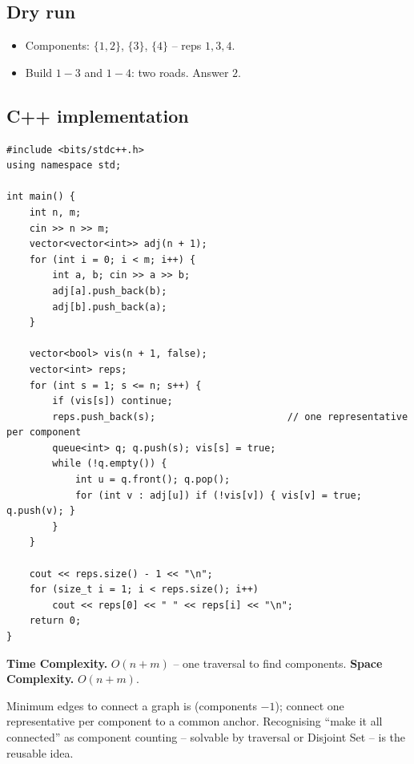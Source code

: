 \subsection*{Dry run}


\begin{itemize}
  \item Components: $\{1,2\}$, $\{3\}$, $\{4\}$ -- reps $1,3,4$.
  \item Build $1\!-\!3$ and $1\!-\!4$: two roads. Answer $2$.
\end{itemize}

\subsection*{C++ implementation}

\begin{lstlisting}
#include <bits/stdc++.h>
using namespace std;

int main() {
    int n, m;
    cin >> n >> m;
    vector<vector<int>> adj(n + 1);
    for (int i = 0; i < m; i++) {
        int a, b; cin >> a >> b;
        adj[a].push_back(b);
        adj[b].push_back(a);
    }

    vector<bool> vis(n + 1, false);
    vector<int> reps;
    for (int s = 1; s <= n; s++) {
        if (vis[s]) continue;
        reps.push_back(s);                       // one representative per component
        queue<int> q; q.push(s); vis[s] = true;
        while (!q.empty()) {
            int u = q.front(); q.pop();
            for (int v : adj[u]) if (!vis[v]) { vis[v] = true; q.push(v); }
        }
    }

    cout << reps.size() - 1 << "\n";
    for (size_t i = 1; i < reps.size(); i++)
        cout << reps[0] << " " << reps[i] << "\n";
    return 0;
}
\end{lstlisting}

\begin{complexitybox}
\textbf{Time Complexity.} $O(n+m)$ -- one traversal to find components.
\textbf{Space Complexity.} $O(n+m)$.
\end{complexitybox}

\begin{takeawaybox}
Minimum edges to connect a graph is (components $-1$); connect one
representative per component to a common anchor. Recognising ``make it all
connected'' as component counting -- solvable by traversal or Disjoint Set
-- is the reusable idea.
\end{takeawaybox}
